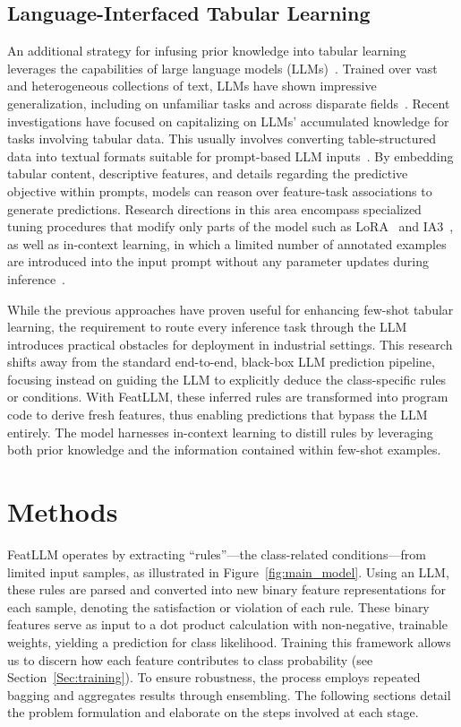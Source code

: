\subsection{Language-Interfaced Tabular Learning} An additional strategy for infusing prior knowledge into tabular learning leverages the capabilities of large language models (LLMs)~\cite{anil2023palm,openai2023gpt4}. Trained over vast and heterogeneous collections of text, LLMs have shown impressive generalization, including on unfamiliar tasks and across disparate fields~\cite{brown2020language}. Recent investigations have focused on capitalizing on LLMs’ accumulated knowledge for tasks involving tabular data. This usually involves converting table-structured data into textual formats suitable for prompt-based LLM inputs~\cite{dinh2022lift,hegselmann2023tabllm,wang2023anypredict}. By embedding tabular content, descriptive features, and details regarding the predictive objective within prompts, models can reason over feature-task associations to generate predictions. Research directions in this area encompass specialized tuning procedures that modify only parts of the model such as LoRA~\cite{hu2021lora} and IA3~\cite{liu2022few}, as well as in-context learning, in which a limited number of annotated examples are introduced into the input prompt without any parameter updates during inference~\cite{dinh2022lift,hegselmann2023tabllm,nam2023semi,slack2023tablet}.

While the previous approaches have proven useful for enhancing few-shot tabular learning, the requirement to route every inference task through the LLM introduces practical obstacles for deployment in industrial settings. This research shifts away from the standard end-to-end, black-box LLM prediction pipeline, focusing instead on guiding the LLM to explicitly deduce the class-specific rules or conditions. With \textsf{FeatLLM}, these inferred rules are transformed into program code to derive fresh features, thus enabling predictions that bypass the LLM entirely. The model harnesses in-context learning to distill rules by leveraging both prior knowledge and the information contained within few-shot examples.

\section{Methods}
\textsf{FeatLLM} operates by extracting “rules”—the class-related conditions—from limited input samples, as illustrated in Figure~\ref{fig:main_model}. Using an LLM, these rules are parsed and converted into new binary feature representations for each sample, denoting the satisfaction or violation of each rule. These binary features serve as input to a dot product calculation with non-negative, trainable weights, yielding a prediction for class likelihood. Training this framework allows us to discern how each feature contributes to class probability (see Section~\ref{Sec:training}). To ensure robustness, the process employs repeated bagging and aggregates results through ensembling. The following sections detail the problem formulation and elaborate on the steps involved at each stage.

